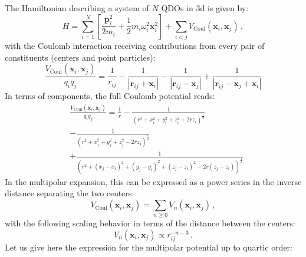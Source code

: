 \documentclass[reprint, amsmath, amssymb, aps]{revtex4-2}
\begin{document}
    The Hamiltonian describing a system of $N$ QDOs in 3d is given by:
    \begin{equation}
    \label{eq:full_QDO_Hamiltonian}
        H=\sum_{i=1}^N\left[\frac{\bm{p} _i^2}{2m_i} + \frac{1}{2}m_i\omega_i^2\bm{x} _i^2\right] +\sum_{i<j}V_\text{Coul}\left(\bm{x} _i, \bm{x} _j\right)\,,
    \end{equation}
    with the Coulomb interaction receiving contributions from every pair of constituents (centers and point particles):
    \begin{equation}
    \label{eq:full_coulomb_potential}
        \frac{V_\text{Coul}\left(\bm{x} _i, \bm{x} _j\right)}{q_iq_j}=\frac{1}{r_{ij}} - \frac{1}{|\bm{r}_{ij}  + \bm{x} _i|} - \frac{1}{|\bm{r}_{ij}  - \bm{x} _j|} + \frac{1}{|\bm{r}_{ij} - \bm{x} _j + \bm{x} _i|}
    \end{equation}
    In terms of components, the full Coulomb potential reads:
    \begin{equation*}
    \begin{split}
        &\frac{V_\text{Coul}(\bm{x} _i, \bm{x} _j)}{q_iq_j} = \frac{1}{r} - \frac{1}{\left(r^2 + x_i^2+y_i^2+z_i^2+2rz_i\right)^{\frac{1}{2}}} \\
        &- \frac{1}{\left(r^2 + x_j^2+y_j^2+z_j^2-2rz_j\right)^{\frac{1}{2}}} \\
        &+\frac{1}{\left(r^2 + (x_j-x_i)^2+(y_j-y_i)^2+(z_j-z_i)^2-2r(z_j-z_i)\right)^{\frac{1}{2}}}
    \end{split}
    \end{equation*}
    In the multipolar expansion, this can be expressed as a power series in the inverse distance separating the two centers:
    \begin{equation}
        V_\text{Coul}\left(\bm{x} _i, \bm{x} _j\right)= \sum_{n\geq 0} V_n\left(\bm{x} _i, \bm{x} _j\right)\,,
    \end{equation}
    with the following scaling behavior in terms of the distance between the centers:
    \begin{equation}
        V_n\left(\bm{x} _i, \bm{x} _j\right)\propto r_{ij}^{-n-3}\,.
    \end{equation}
    Let us give here the expression for the multipolar potential up to quartic order:
\end{document}
